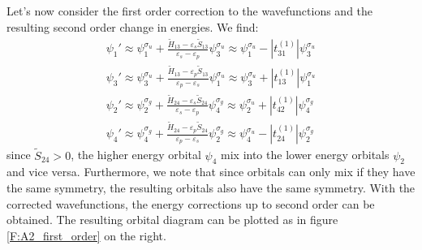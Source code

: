 \documentclass{article}
\newcommand{\order}[2]{#1^{(#2)}}
\begin{document}
Let's now consider the first order correction to the wavefunctions and the resulting 
second order change in energies. We find:
\begin{align}
    \psi_1' \approx  \psi_1^{\sigma_u} + \frac{\tilde{H}_{13} - \varepsilon_s \tilde{S}_{13}}{\varepsilon_s - \varepsilon_p} \psi_3^{\sigma_u} 
            \approx \psi_1^{\sigma_u} - |\order{t_{31}}{1}| \psi_3^{\sigma_u} \\ 
    \psi_3' \approx  \psi_3^{\sigma_u} + \frac{\tilde{H}_{13} - \varepsilon_p \tilde{S}_{13}}{\varepsilon_p - \varepsilon_s} \psi_1^{\sigma_u}
            \approx \psi_3^{\sigma_u} + |\order{t_{13}}{1}| \psi_1^{\sigma_u} \\ 
    \psi_2' \approx  \psi_2^{\sigma_g} + \frac{\tilde{H}_{24} - \varepsilon_s \tilde{S}_{24}}{\varepsilon_s - \varepsilon_p} \psi_4^{\sigma_g} 
            \approx \psi_2^{\sigma_u} + |\order{t_{42}}{1}| \psi_4^{\sigma_g} \\ 
    \psi_4' \approx  \psi_4^{\sigma_g} + \frac{\tilde{H}_{24} - \varepsilon_p \tilde{S}_{24}}{\varepsilon_p - \varepsilon_s} \psi_2^{\sigma_g} 
            \approx \psi_4^{\sigma_u} - |\order{t_{24}}{1}| \psi_2^{\sigma_g}
\end{align}
since $\tilde{S}_{24} > 0$, the higher energy orbital $\psi_4$ mix into the lower energy orbitals $\psi_2$ and vice versa. Furthermore, we note 
that since orbitals can only mix if they have the same symmetry, the resulting orbitals also have the same symmetry. With the 
corrected wavefunctions, the energy corrections up to second order can be obtained. 
The resulting orbital diagram can be plotted as in figure \ref{F:A2_first_order} on the right. 
\end{document}

